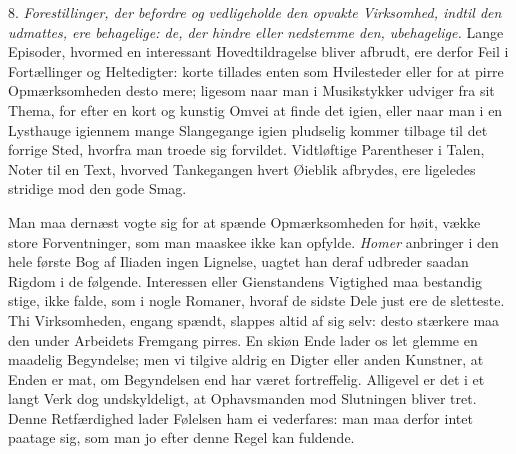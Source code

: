 \documentclass[12pt,a4paper]{article}
\newcommand{\opage}[1]{\marginnote{\footnotesize\textit{[#1]}}}
\begin{document}
8. \emph{Forestillinger, der befordre og vedligeholde den opvakte Virksomhed, indtil den
udmattes, ere behagelige: de, der hindre eller nedstemme den, ubehagelige.} Lange
Episoder, hvormed en interessant Hovedtildragelse bliver afbrudt, ere derfor Feil i
Fortællinger og Heltedigter: korte tillades enten som Hvilesteder eller for at pirre
Opmærksomheden desto mere; ligesom naar man i Musikstykker udviger fra sit Thema, for efter
en kort og kunstig Omvei at finde det igien, eller naar man i en Lysthauge igiennem mange
Slangegange igien pludselig kommer tilbage til det forrige Sted, hvorfra man troede sig
forvildet. Vidtløftige Parentheser i Talen, Noter til en Text, hvorved Tankegangen hvert
Øieblik afbrydes, ere ligeledes stridige mod den gode Smag.

\opage{204} Man maa dernæst vogte sig for at spænde Opmærksomheden for høit, vække store
Forventninger, som man maaskee ikke kan opfylde. \emph{Homer} anbringer i den hele første
Bog af Iliaden ingen Lignelse, uagtet han deraf udbreder saadan Rigdom i de følgende.
Interessen eller Gienstandens Vigtighed maa bestandig stige, ikke falde, som i nogle
Romaner, hvoraf de sidste Dele just ere de sletteste. Thi Virksomheden, engang spændt,
slappes altid af sig selv: desto stærkere maa den under Arbeidets Fremgang pirres. En skiøn
Ende lader os let glemme en maadelig Begyndelse; men vi tilgive aldrig en Digter eller
anden Kunstner, at Enden er mat, om Begyndelsen end har været fortreffelig. Alligevel er
det i et langt Verk dog undskyldeligt, at Ophavsmanden mod Slutningen bliver tret. Denne
Retfærdighed lader Følelsen ham ei vederfares: man maa derfor intet paatage sig, som man jo
efter denne Regel kan fuldende.
\end{document}
